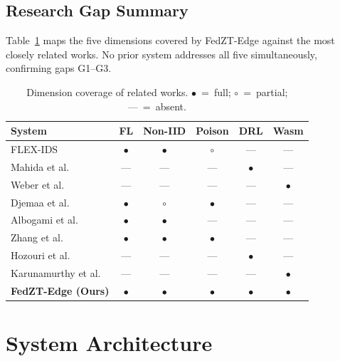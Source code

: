 \documentclass[iicol,sn-mathphys,Numbered]{sn-jnl}
\begin{document}
\subsection{Research Gap Summary}
Table~\ref{tab:related} maps the five dimensions covered by FedZT-Edge against the most closely related works. No prior system addresses all five simultaneously, confirming gaps G1--G3.

\begin{table}[htbp]
\caption{Dimension coverage of related works. $\bullet$~=~full; $\circ$~=~partial; ---~=~absent.}\label{tab:related}
\centering\footnotesize
\setlength{\tabcolsep}{2.5pt}
\begin{tabular*}{\columnwidth}{@{\extracolsep{\fill}}lccccc@{}}
\toprule
\textbf{System} & \textbf{FL} & \textbf{Non-IID} & \textbf{Poison} & \textbf{DRL} & \textbf{Wasm} \\
\midrule
FLEX-IDS~\cite{flexids}             & $\bullet$ & $\bullet$ & $\circ$   & ---       & --- \\
Mahida et al.~\cite{mahida2026}     & ---       & ---       & ---       & $\bullet$ & --- \\
Weber et al.~\cite{weber2026}       & ---       & ---       & ---       & ---       & $\bullet$ \\
Djemaa et al.~\cite{djemaa2026}     & $\bullet$ & $\circ$   & $\bullet$ & ---       & --- \\
Albogami et al.~\cite{albogami2025} & $\bullet$ & $\bullet$ & ---       & ---       & --- \\
Zhang et al.~\cite{zhang2025}       & $\bullet$ & $\bullet$ & $\bullet$ & ---       & --- \\
Hozouri et al.~\cite{hozouri2025}   & ---       & ---       & ---       & $\bullet$ & --- \\
Karunamurthy et al.~\cite{karunamurthy2025} & --- & ---    & ---       & ---       & $\bullet$ \\
\midrule
\textbf{FedZT-Edge (Ours)}          & $\bullet$ & $\bullet$ & $\bullet$ & $\bullet$ & $\bullet$ \\
\bottomrule
\end{tabular*}
\end{table}

\section{System Architecture}\label{sec:architecture}
\end{document}
